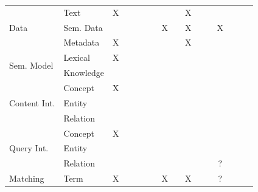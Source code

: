 \begin{table}[htbp]
\begin{tabular}{rrcccccccccccccc}
    \multicolumn{1}{l}{\multirow{3}[0]{*}{Data}} & \multicolumn{1}{l}{Text} & X     &       &       &       &       &       &       & X     &       &       &       &       &       &  \\
    \multicolumn{1}{l}{} & \multicolumn{1}{l}{Sem. Data} &       &       &       &       &       & X     &       & X     &       &       & X     &       &       &  \\
    \multicolumn{1}{l}{} & \multicolumn{1}{l}{Metadata} & X     &       &       &       &       &       &       & X     &       &       &       &       &       &  \\
    \multicolumn{1}{l}{\multirow{2}[0]{*}{Sem. Model}} & \multicolumn{1}{l}{Lexical} & X     &       &       &       &       &       &       &       &       &       &       &       &       &  \\
    \multicolumn{1}{l}{} & \multicolumn{1}{l}{Knowledge} &       &       &       &       &       &       &       &       &       &       &       &       &       &  \\
    \multicolumn{1}{l}{\multirow{3}[0]{*}{Content Int.}} & \multicolumn{1}{l}{Concept} & X     &       &       &       &       &       &       &       &       &       &       &       &       &  \\
    \multicolumn{1}{l}{} & \multicolumn{1}{l}{Entity} &       &       &       &       &       &       &       &       &       &       &       &       &       &  \\
    \multicolumn{1}{l}{} & \multicolumn{1}{l}{Relation} &       &       &       &       &       &       &       &       &       &       &       &       &       &  \\
    \multicolumn{1}{l}{\multirow{3}[0]{*}{Query Int.}} & \multicolumn{1}{l}{Concept} & X     &       &       &       &       &       &       &       &       &       &       &       &       &  \\
    \multicolumn{1}{l}{} & \multicolumn{1}{l}{Entity} &       &       &       &       &       &       &       &       &       &       &       &       &       &  \\
    \multicolumn{1}{l}{} & \multicolumn{1}{l}{Relation} &       &       &       &       &       &       &       &       &       &       & ?     &       &       &  \\
    \multicolumn{1}{l}{\multirow{4}[0]{*}{Matching}} & \multicolumn{1}{l}{Term} & X     &       &       &       &       & X     &       & X     &       &       & ?     &       &       &  \\

\end{tabular}
\end{table}
